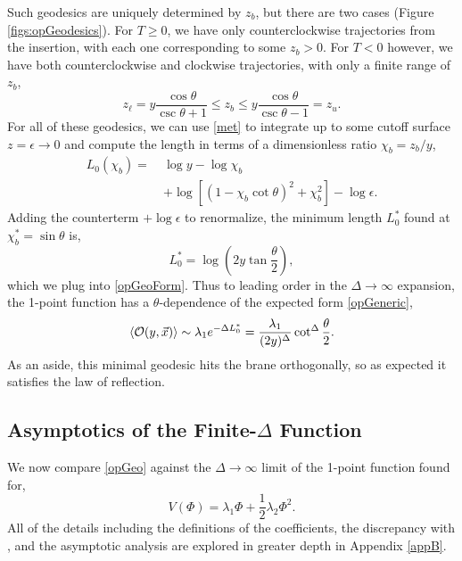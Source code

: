 \documentclass[reprint,amsmath,amssymb,aps,nofootinbib,twocolumn]{revtex4-2}
\begin{document}
Such geodesics are uniquely determined by $z_b$, but there are two cases (Figure \ref{figs:opGeodesics}). For $T \geq 0$, we have only counterclockwise trajectories from the insertion, with each one corresponding to some $z_b > 0$. For $T < 0$ however, we have both counterclockwise and clockwise trajectories, with only a finite range of $z_b$,
\begin{equation}
z_\ell = y \frac{\cos\theta}{\csc\theta + 1} \leq z_b \leq y \frac{\cos\theta}{\csc\theta - 1} = z_u.\label{boundsNegTen}
\end{equation}
For all of these geodesics, we can use \eqref{met} to integrate up to some cutoff surface $z = \epsilon \to 0$ and compute the length in terms of a dimensionless ratio $\chi_b = z_b/y$,
\begin{equation}
\begin{split}
L_0(\chi_b) =\ &\log y - \log \chi_b\\
&+ \log\left[\left(1 - \chi_b \cot\theta\right)^2 + \chi_b^2\right] - \log\epsilon.\label{length}
\end{split}
\end{equation}
Adding the counterterm $+\log\epsilon$ to renormalize, the minimum length $L_0^*$ found at $\chi_b^* = \sin\theta$ is,
\begin{equation}
L_0^* = \log\left(2y\tan\frac{\theta}{2}\right),
\end{equation}
which we plug into \eqref{opGeoForm}. Thus to leading order in the $\Delta \to \infty$ expansion, the 1-point function has a $\theta$-dependence of the expected form \eqref{opGeneric},
\begin{equation}
\expval{\mathcal{O}(y,\vec{x})} \sim \lambda_1 e^{-\Delta L_0^*} = \frac{\lambda_1}{(2y)^{\Delta}} \cot^\Delta\frac{\theta}{2}.\label{opGeo}
\end{equation}
As an aside, this minimal geodesic hits the brane orthogonally, so as expected it satisfies the law of reflection.

\subsection{Asymptotics of the Finite-$\Delta$ Function}

We now compare \eqref{opGeo} against the $\Delta \to \infty$ limit of the 1-point function found for,
\begin{equation}
V(\Phi) = \lambda_1 \Phi + \frac{1}{2}\lambda_2 \Phi^2.
\end{equation}
All of the details including the definitions of the coefficients, the discrepancy with \cite{Fujita:2011fp}, and the asymptotic analysis are explored in greater depth in Appendix \ref{appB}.
\end{document}
